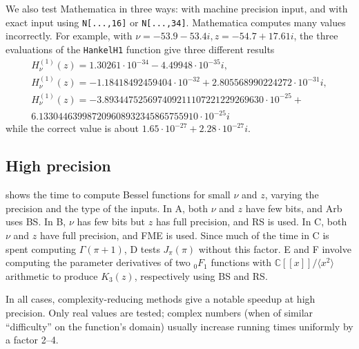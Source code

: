 \documentclass[11pt,a4paper]{article}
\begin{document}
We also test Mathematica in three ways: with machine precision input,
and with exact input using \texttt{N[...,16]} or \texttt{N[...,34]}.
Mathematica computes many values incorrectly. For example,
with $\nu=-53.9-53.4i, z = -54.7+17.61i$, the three evaluations
of the \texttt{HankelH1} function give three different results
\begin{equation*}
\begin{array}{c}
H^{(1)}_{\nu}(z) = 1.30261 \cdot 10^{-34} - 4.49948 \cdot 10^{-35} i, \\
H^{(1)}_{\nu}(z) = -1.18418492459404 \cdot 10^{-32} + 2.805568990224272 \cdot 10^{-31} i, \\
H^{(1)}_{\nu}(z) = -3.893447525697409211107221229269630 \cdot 10^{-25} + \\
6.133044639987209608932345865755910 \cdot 10^{-25} i
\end{array}
\end{equation*}
while the correct value is about $1.65 \cdot 10^{-27} + 2.28 \cdot 10^{-27} i$.

\subsection{High precision}

 shows the time to compute Bessel functions
for small $\nu$ and $z$,
varying the precision and the type of the inputs.
In A, both $\nu$ and $z$ have few bits, and Arb uses BS.
In B, $\nu$ has few bits but $z$ has full precision, and RS is used.
In C, both $\nu$ and $z$ have full precision, and FME is used.
Since much of the time in C is spent computing $\Gamma(\pi+1)$,
D tests $J_{\pi}(\pi)$ without this factor.
E and F involve computing the parameter derivatives
of two ${}_0F_1$ functions with $\mathbb{C}[[x]] / \langle x^2 \rangle$
arithmetic to produce $K_3(z)$, respectively using BS and RS.

In all cases, complexity-reducing methods give a notable speedup at high precision.
Only real values are tested; complex numbers (when of similar
``difficulty'' on the function's domain)
usually increase running times uniformly by a factor 2--4.
\end{document}

